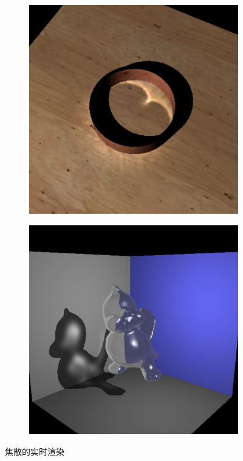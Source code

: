 \begin{figure}
\sidecaption
	\begin{subfigure}[b]{.315\textwidth}
		\includegraphics[width=1.0\textwidth]{figures/ir/ir-3-4}
	\end{subfigure}
	\begin{subfigure}[b]{.315\textwidth}
		\includegraphics[width=1.0\textwidth]{figures/ir/ir-3-5}
	\end{subfigure}
\caption{焦散的实时渲染}
\label{f:ir-non-diffuse-surfaces}
\end{figure}



